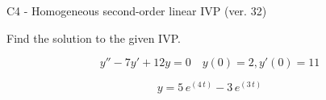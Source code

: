 \begin{exercise}
  \begin{exerciseTitle}C4 - Homogeneous second-order linear IVP (ver. 32)\end{exerciseTitle}
  \begin{exerciseStatement}
    
Find the solution to the given IVP.

    
\[y''-7y'+12y = 0 \hspace{1em} y(0) = 2 , y'(0) = 11\]

  \end{exerciseStatement}
  \begin{exerciseAnswer}
    
\[y= 5 \, e^{\left(4 \, t\right)} - 3 \, e^{\left(3 \, t\right)}\]

  \end{exerciseAnswer}
\end{exercise}